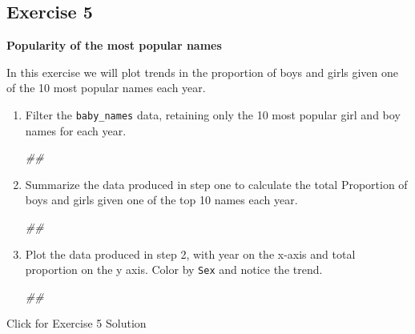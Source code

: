 \documentclass[]{book}
\newenvironment{Shaded}{\begin{snugshade}}{\end{snugshade}}
\newcommand{\CommentTok}[1]{\textcolor[rgb]{0.56,0.35,0.01}{\textit{#1}}}
\begin{document}
\hypertarget{exercise-5}{%
\subsection{Exercise 5}\label{exercise-5}}

\textbf{Popularity of the most popular names}

In this exercise we will plot trends in the proportion of boys and girls
given one of the 10 most popular names each year.

\begin{enumerate}
\def\labelenumi{\arabic{enumi}.}
\item
  Filter the \texttt{baby\_names} data, retaining only the 10 most popular girl
  and boy names for each year.

\begin{Shaded}
\begin{Highlighting}[]
\CommentTok{##}
\end{Highlighting}
\end{Shaded}
\item
  Summarize the data produced in step one to calculate the total
  Proportion of boys and girls given one of the top 10 names
  each year.

\begin{Shaded}
\begin{Highlighting}[]
\CommentTok{##}
\end{Highlighting}
\end{Shaded}
\item
  Plot the data produced in step 2, with year on the x-axis
  and total proportion on the y axis. Color by \texttt{Sex} and notice
  the trend.

\begin{Shaded}
\begin{Highlighting}[]
\CommentTok{##}
\end{Highlighting}
\end{Shaded}
\end{enumerate}

{Click for Exercise 5 Solution}
\end{document}

